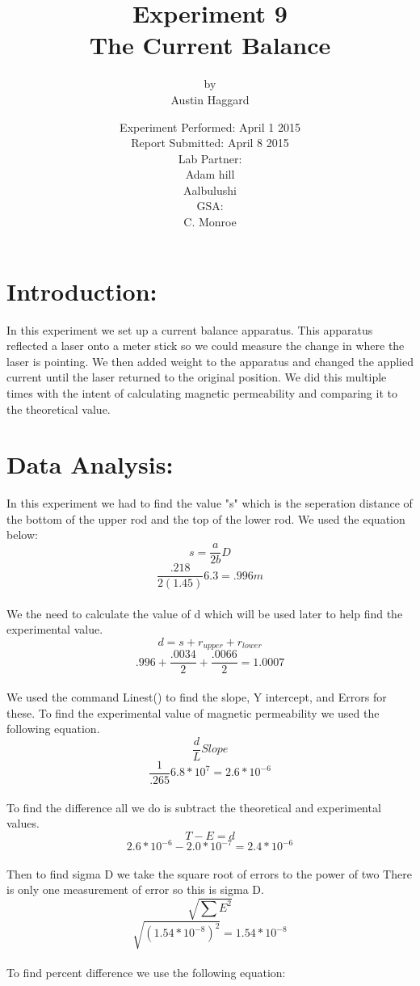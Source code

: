 \documentclass{article}
\title{Experiment 9 \\ The Current Balance}
\author{by \\ Austin Haggard}
\date{
	Experiment Performed: April 1 2015 \\
	Report Submitted: April 8 2015 \\[11pt]
	Lab Partner: \\ Adam hill \\ Aalbulushi \\[11pt] 
	GSA: \\ C. Monroe
}
\begin{document}
\maketitle
\thispagestyle{empty}
\newpage

\section*{Introduction:}
\setcounter{page}{1}
In this experiment we set up a current balance apparatus.  This apparatus reflected a laser onto a meter stick so we could measure the change in where the laser is pointing.  We then added weight to the apparatus and changed the applied current until the laser returned to the original position.  We did this multiple times with the intent of calculating magnetic permeability and comparing it to the theoretical value.
\newpage


\section*{Data Analysis:}
\setcounter{page}{3}
In this experiment we had to find the value "s" which is the seperation distance of the bottom of the upper rod and the top of the lower  rod.  We used the equation below:
\[s=\frac{a}{2b}D\]
\[\frac{.218}{2(1.45)}6.3 = .996m\]
\\
We the need to calculate the value of d which will be used later to help find the experimental value.
\[d=s+r_{upper}+r_{lower}\]
\[.996+\frac{.0034}{2}+\frac{.0066}{2}=1.0007\]
\\
We used the command Linest() to find the slope, Y intercept, and Errors for these.  To find the experimental value  of magnetic permeability we used the following equation.
\[\frac{d}{L}Slope\]
\[\frac{1}{.265}6.8*10^7=2.6*10^{-6}\]
\\
To find the difference all we do is subtract the theoretical and experimental values.
\[T - E = d\]
\[2.6*10^{-6} -  2.0* 10^{-7}=2.4*10^{-6}\]
\\
Then to find sigma D we take the square root of errors to the power of two  There is only one measurement of error so this is sigma D.
\[\sqrt{\sum E^2}\]
\[\sqrt{(1.54*10^{-8})^2} = 1.54*10^{-8}\]
\\
To find percent difference we use the following equation:
\end{document}
